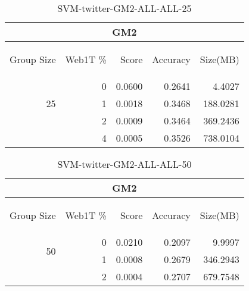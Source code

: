 \begin{center}
\begin{table}[htbp] 
 \begin{center}
\begin{tabular}{ | r | r | r | r | r |}
\hline
\multicolumn{5}{|c|}{GM2}\\
\hline
\begin{sideways}Group Size\end{sideways} & \begin{sideways}Web1T \%\end{sideways} & \begin{sideways}Score\end{sideways} & \begin{sideways}Accuracy\end{sideways} & \begin{sideways}Size(MB)\end{sideways}\\
\hline
\multirow{3}{*}{25}
 & 0 & 0.0600 & 0.2641 & 4.4027\\ \cline{2-5}
 & 1 & 0.0018 & 0.3468 & 188.0281\\ \cline{2-5}
 & 2 & 0.0009 & 0.3464 & 369.2436\\ \cline{2-5}
 & 4 & 0.0005 & 0.3526 & 738.0104\\ \cline{2-5}
\hline
\end{tabular}
\caption{SVM-twitter-GM2-ALL-ALL-25}
\label{table:SVM-twitter-GM2-ALL-ALL-25}
\end{center}
 \end{table}
\end{center}

\begin{center}
\begin{table}[htbp] 
 \begin{center}
\begin{tabular}{ | r | r | r | r | r |}
\hline
\multicolumn{5}{|c|}{GM2}\\
\hline
\begin{sideways}Group Size\end{sideways} & \begin{sideways}Web1T \%\end{sideways} & \begin{sideways}Score\end{sideways} & \begin{sideways}Accuracy\end{sideways} & \begin{sideways}Size(MB)\end{sideways}\\
\hline
\multirow{2}{*}{50}
 & 0 & 0.0210 & 0.2097 & 9.9997\\ \cline{2-5}
 & 1 & 0.0008 & 0.2679 & 346.2943\\ \cline{2-5}
 & 2 & 0.0004 & 0.2707 & 679.7548\\ \cline{2-5}
\hline
\end{tabular}
\caption{SVM-twitter-GM2-ALL-ALL-50}
\label{table:SVM-twitter-GM2-ALL-ALL-50}
\end{center}
 \end{table}
\end{center}


